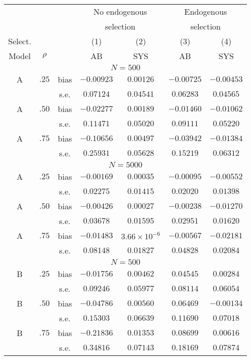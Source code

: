 \begin{tabular}{@{}ccc*{4}{c}@{}}
\toprule
& & & \multicolumn{2}{c}{No endogenous} & \multicolumn{2}{c}{Endogenous} \\
& & & \multicolumn{2}{c}{selection} & \multicolumn{2}{c}{selection} \\
\cmidrule(lr){4-5} \cmidrule(lr){6-7}
Select. & & & (1) & (2) & (3) & (4) \\
Model & $\rho$ & & AB & SYS & AB & SYS \\
\midrule
\midrule
\multicolumn{7}{c}{$N = 500$} \\
\midrule
A & $.25$ & bias & $-0.00923$ & $0.00126$ & $-0.00725$ & $-0.00453$ \\
& & s.e. & $0.07124$ & $0.04541$ & $0.06283$ & $0.04565$ \\
A & $.50$ & bias & $-0.02277$ & $0.00189$ & $-0.01460$ & $-0.01062$ \\
& & s.e. & $0.11471$ & $0.05020$ & $0.09111$ & $0.05220$ \\
A & $.75$ & bias & $-0.10656$ & $0.00497$ & $-0.03942$ & $-0.01384$ \\
& & s.e. & $0.25931$ & $0.05628$ & $0.15219$ & $0.06312$ \\
\midrule
\multicolumn{7}{c}{$N = 5000$} \\
\midrule
A & $.25$ & bias & $-0.00169$ & $0.00035$ & $-0.00095$ & $-0.00552$ \\
& & s.e. & $0.02275$ & $0.01415$ & $0.02020$ & $0.01398$ \\
A & $.50$ & bias & $-0.00426$ & $0.00027$ & $-0.00238$ & $-0.01270$ \\
& & s.e. & $0.03678$ & $0.01595$ & $0.02951$ & $0.01620$ \\
A & $.75$ & bias & $-0.01483$ & $3.66 \times 10^{-6}$ & $-0.00567$ & $-0.02181$ \\
& & s.e. & $0.08148$ & $0.01827$ & $0.04828$ & $0.02084$ \\
\midrule
\multicolumn{7}{c}{$N = 500$} \\
\midrule
B & $.25$ & bias & $-0.01756$ & $0.00462$ & $0.04545$ & $0.00284$ \\
& & s.e. & $0.09246$ & $0.05977$ & $0.08114$ & $0.06054$ \\
B & $.50$ & bias & $-0.04786$ & $0.00560$ & $0.06469$ & $-0.00134$ \\
& & s.e. & $0.15303$ & $0.06639$ & $0.11690$ & $0.07018$ \\
B & $.75$ & bias & $-0.21836$ & $0.01353$ & $0.08699$ & $0.00616$ \\
& & s.e. & $0.34816$ & $0.07143$ & $0.18169$ & $0.07874$ \\

\end{tabular}
